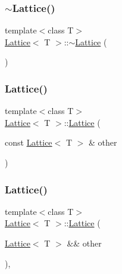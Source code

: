 \mbox{\label{class_lattice_a006bd75dd4c599fe17f8ca7e96413487}} 
\subsubsection{\texorpdfstring{$\sim$Lattice()}{~Lattice()}}
{\footnotesize\ttfamily template$<$class T$>$ \\
\mbox{\hyperlink{class_lattice}{Lattice}}$<$ T $>$\+::$\sim$\mbox{\hyperlink{class_lattice}{Lattice}} (\begin{DoxyParamCaption}{ }\end{DoxyParamCaption})\hspace{0.3cm}{\ttfamily [inline]}}

\mbox{\label{class_lattice_a74cc98beb36f76dcfa27535e43528d57}} 
\subsubsection{\texorpdfstring{Lattice()}{Lattice()}\hspace{0.1cm}{\footnotesize\ttfamily [3/4]}}
{\footnotesize\ttfamily template$<$class T$>$ \\
\mbox{\hyperlink{class_lattice}{Lattice}}$<$ T $>$\+::\mbox{\hyperlink{class_lattice}{Lattice}} (\begin{DoxyParamCaption}\item[{const \mbox{\hyperlink{class_lattice}{Lattice}}$<$ T $>$ \&}]{other }\end{DoxyParamCaption})\hspace{0.3cm}{\ttfamily [inline]}}

\mbox{\label{class_lattice_ad2826da8e42dcaea917b9a2e50ca1ca2}} 
\subsubsection{\texorpdfstring{Lattice()}{Lattice()}\hspace{0.1cm}{\footnotesize\ttfamily [4/4]}}
{\footnotesize\ttfamily template$<$class T$>$ \\
\mbox{\hyperlink{class_lattice}{Lattice}}$<$ T $>$\+::\mbox{\hyperlink{class_lattice}{Lattice}} (\begin{DoxyParamCaption}\item[{\mbox{\hyperlink{class_lattice}{Lattice}}$<$ T $>$ \&\&}]{other }\end{DoxyParamCaption})\hspace{0.3cm}{\ttfamily [inline]}, {\ttfamily [noexcept]}}



